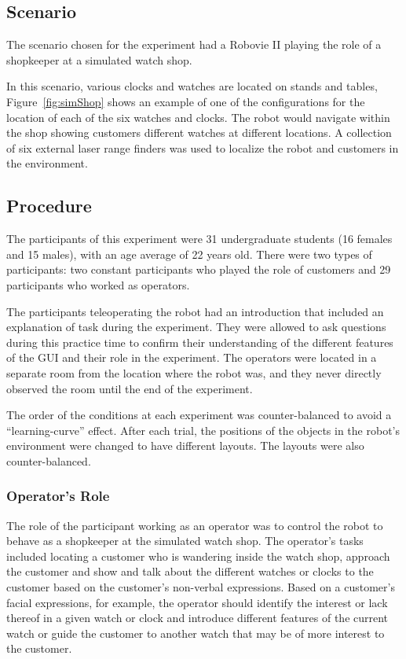 \documentclass[a4paper, 10pt, conference]{ieeeconf}     %
\begin{document}
\subsection{Scenario}
The scenario chosen for the experiment had a Robovie II playing the role of a shopkeeper at a simulated watch shop. 


In this scenario, various clocks and watches are located on stands and tables, Figure~\ref{fig:simShop} shows an example of one of the configurations for the location of each of the six watches and clocks.
The robot would navigate within the shop showing customers different watches at different locations. A collection of six external laser range finders was used to localize the robot and customers in the environment. 

\subsection{Procedure}
The participants of this experiment were 31 undergraduate students (16 females and 15 males), with an age average of 22 years old.
There were two types of participants: two constant participants who played the role of customers and 29 participants who worked as operators.  

The participants teleoperating the robot had an introduction that included an explanation of task during the experiment. 
They were allowed to ask questions during this practice time to confirm their understanding of the different features of the GUI and their role in the experiment.
The operators were located in a separate room from the location where the robot was, and they never directly observed the room until the end of the experiment. 

The order of the conditions at each experiment was counter-balanced to avoid a ``learning-curve'' effect.
After each trial, the positions of the objects in the robot's environment were changed to have different layouts. 
The layouts were also counter-balanced.

\subsubsection{Operator's Role}
The role of the participant working as an operator was to control the robot to behave as a shopkeeper at the simulated watch shop. 
The operator's tasks included locating a customer who is wandering inside the watch shop, approach the customer and show and talk about the different watches or clocks to the customer based on the customer's non-verbal expressions. 
Based on a customer's facial expressions, for example, the operator should identify the interest or lack thereof in a given watch or clock and introduce different features of the current watch or guide the customer to another watch that may be of more interest to the customer. 
\end{document}
